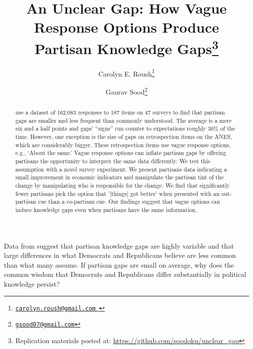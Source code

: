 \documentclass[12pt, letterpaper]{article}
\title{An Unclear Gap: How Vague Response Options Produce Partisan Knowledge Gaps\thanks{Replication materials posted at: \url{ https://github.com/soodoku/unclear_gap}}}
\author{Carolyn E. Roush\thanks{\href{mailto:carolyn.roush@gmail.com}{\texttt{carolyn.roush@gmail.com }}} \and Gaurav Sood\thanks{\href{mailto:gsood07@gmail.com}{\texttt{gsood07@gmail.com}}}}
\begin{document}
\maketitle
\thispagestyle{empty}

\begin{abstract}

\noindent \citet{roush_2021} use a dataset of 162,083 responses to 187 items on 47 surveys to find that partisan gaps are smaller and less frequent than commonly understood. The average is a mere six and a half points and gaps' ``signs'' run counter to expectations roughly 30\% of the time. However, one exception is the size of gaps on retrospection items on the ANES, which are considerably bigger. These retrospection items use vague response options, e.g., `About the same.' Vague response options can inflate partisan gaps by offering partisans the opportunity to interpret the same data differently. We test this assumption with a novel survey experiment. We present partisans data indicating a small improvement in economic indicators and manipulate the partisan tint of the change by manipulating who is responsible for the change. We find that significantly fewer partisans pick the option that '[things] got better' when presented with an out-partisan cue than a co-partisan cue. Our findings suggest that vague options can induce knowledge gaps even when partisans have the same information.
\end{abstract}

\vspace{.2in}


\newpage

\doublespacing
Data from \citet{roush_2021} suggest that partisan knowledge gaps are highly variable and that large differences in what Democrats and Republicans believe are less common than what many assume. If partisan gaps are small on average, why does the common wisdom that Democrats and Republicans differ substantially in political knowledge persist? 
\end{document}
